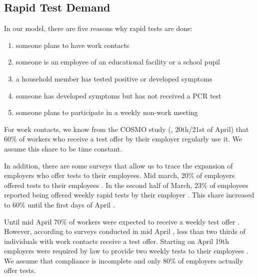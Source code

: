 \subsection{Rapid Test Demand}
\label{subsec:rapid_test_demand}

In our model, there are five reasons why rapid tests are done:

\begin{enumerate}
    \item someone plans to have work contacts
    \item someone is an employee of an educational facility or a school pupil
    \item a household member has tested positive or developed symptoms
    \item someone has developed symptoms but has not received a PCR test
    \item someone plans to participate in a weekly non-work meeting
\end{enumerate}


For work contacts, we know from the COSMO study (\cite{Betsch2021}, 20th/21st of April)
that 60\% of workers who receive a test offer by their employer regularly use it. We
assume this share to be time constant.

In addition, there are some surveys that allow us to trace the expansion of employers who
offer tests to their employees. Mid march, 20\% of employers offered tests to their
employees \citep{DIHK2021}. In the second half of March, 23\% of employees reported being
offered weekly rapid tests by their employer \citep{Ahlers2021}. This share increased to
60\% until the first days of April \cite{ZDF2021}.

Until mid April 70\% of workers were expected to receive a weekly test offer
\citep{AerzteZeitung2021}. However, according to surveys conducted in mid April
\citep{Betsch2021}, less than two thirds of individuals with work contacts receive a test
offer. Starting on April 19th employers were required by law to provide two weekly tests
to their employees \citep{Bundesanzeiger2021}. We assume that compliance is incomplete
and only 80\% of employers actually offer tests.

